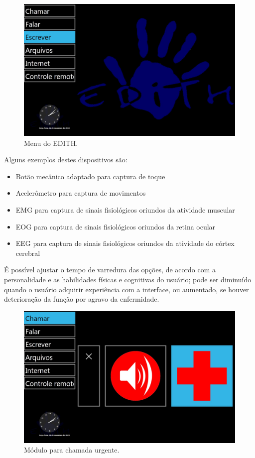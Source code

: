 \documentclass[twoside]{article}
\begin{document}
\begin{multicols}{2}
\begin{figure}[H]
\label{fig:edith_menu}
  \caption{Menu do EDITH.}
  \centering
    \includegraphics[scale = 0.19]{edith_menu.png}
\end{figure}

\noindent Alguns exemplos destes dispositivos são:
\begin{itemize}
\item Botão mecânico adaptado para captura de toque
\item Acelerômetro para captura de movimentos
\item EMG para captura de sinais fisiológicos oriundos da atividade muscular
\item EOG para captura de sinais fisiológicos oriundos da retina ocular
\item EEG para captura de sinais fisiológicos oriundos da atividade do córtex cerebral
\end{itemize}

\noindent É possível ajustar o tempo de varredura das opções, de acordo com a personalidade e as habilidades físicas e cognitivas do usuário; pode ser diminuído quando o usuário adquirir experiência com a interface, ou aumentado, se houver deterioração da função por agravo da enfermidade. 

\begin{figure}[H]
\label{fig:edith_chamar}
  \caption{Módulo para chamada urgente.}
  \centering
    \includegraphics[scale = 0.19]{edith_chamar.png}
\end{figure}


\end{multicols}
\end{document}
